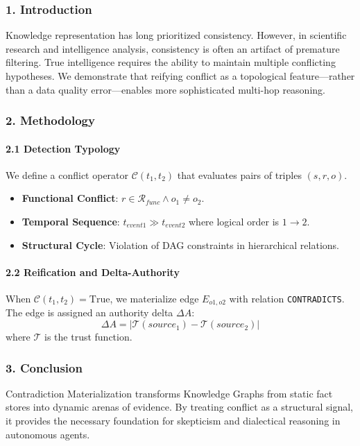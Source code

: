 \documentclass[10pt,journal,compsoc]{IEEEtran}
\begin{document}
\subsubsection{1. Introd\-uction}
Knowledge repre\-sentation has long prioritized consistency. However, in scientific research and intel\-ligence analysis, consistency is often an artifact of premature filtering. True intel\-ligence requires the ability to maintain multiple conflicting hypotheses. We demonstrate that reifying conflict as a topological feature—rather than a data quality error—enables more sophi\-sticated multi-hop reasoning.

\subsubsection{2. Methodology}

\paragraph{2.1 Detection Typology}
We define a conflict operator $\mathcal{C}(t_1, t_2)$ that evaluates pairs of triples $(s, r, o)$.
\begin{itemize}
\item \textbf{Functional Conflict}: $r \in \mathcal{R}_{func} \land o_1 \neq o_2$.
\item \textbf{Temporal Sequence}: $t_{event1} \gg t_{event2}$ where logical order is $1 \to 2$.
\item \textbf{Structural Cycle}: Violation of DAG constraints in hiera\-rchical relations.

\end{itemize}
\paragraph{2.2 Reification and Delta-Authority}
When $\mathcal{C}(t_1, t_2) = \text{True}$, we materialize edge $E_{o1,o2}$ with relation \texttt{CONTRADICTS}. The edge is assigned an authority delta $\Delta A$:
\begin{equation}
\Delta A = | \mathcal{T}(source_1) - \mathcal{T}(source_2) |
\end{equation}
where $\mathcal{T}$ is the trust function.

\subsubsection{3. Conclusion}
Contra\-diction Materi\-alization transforms Knowledge Graphs from static fact stores into dynamic arenas of evidence. By treating conflict as a structural signal, it provides the necessary foundation for skepticism and dialectical reasoning in autonomous agents.
\end{document}
